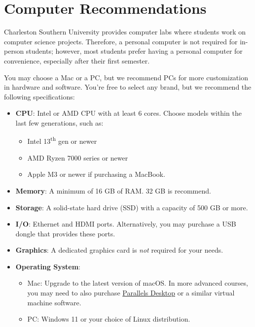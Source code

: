 \section{Computer Recommendations}
Charleston Southern University provides computer labs where students work on computer science projects. Therefore, a personal computer is not required for in-person students; however, most students prefer having a personal computer for convenience, especially after their first semester.

\vspace{1em}
You may choose a Mac or a PC, but we recommend PCs for more customization in hardware and software. You're free to select any brand, but we recommend the following specifications:

\begin{itemize}
    \item
        \textbf{CPU}: Intel or AMD CPU with at least 6 cores. Choose models within the last few generations, such as:
        \begin{itemize}
            \item Intel 13\textsuperscript{th} gen or newer
            \item AMD Ryzen 7000 series or newer
            \item Apple M3 or newer if purchasing a MacBook.
        \end{itemize}
    \item
        \textbf{Memory}: A minimum of 16 GB of RAM\@. 32 GB is recommend.
    \item
        \textbf{Storage}: A solid-state hard drive (SSD) with a capacity of 500 GB or more.
    \item
        \textbf{I/O}: Ethernet and HDMI ports. Alternatively, you may purchase a USB dongle that provides these ports.
    \item
        \textbf{Graphics}: A dedicated graphics card is \emph{not} required for your needs.
    \item
        \textbf{Operating System}:
        \begin{itemize}
            \item {Mac}: Upgrade to the latest version of macOS\@. In more advanced courses, you may need to also purchase \href{https://www.parallels.com/products/desktop/}{Parallels Desktop} or a similar virtual machine software.
            \item {PC}: Windows 11 or your choice of Linux distribution.
        \end{itemize}
\end{itemize}
